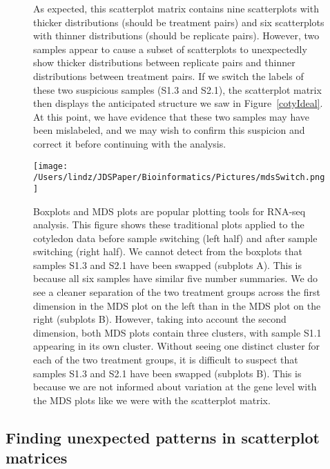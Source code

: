 \documentclass[useAMS,referee]{biom}
\begin{document}
\begin{figure}
\begin{center}
\centerline{}
\end{center}
\caption{As expected, this scatterplot matrix contains nine scatterplots with thicker distributions (should be treatment pairs) and six scatterplots with thinner distributions (should be replicate pairs). However, two samples appear to cause a subset of scatterplots to unexpectedly show thicker distributions between replicate pairs and thinner distributions between treatment pairs. If we switch the labels of these two suspicious samples (S1.3 and S2.1), the scatterplot matrix then displays the anticipated structure we saw in Figure~\ref{cotyIdeal}. At this point, we have evidence that these two samples may have been mislabeled, and we may wish to confirm this suspicion and correct it before continuing with the analysis.
\label{switchedScatMat}}
\end{figure}

\begin{figure}
\begin{center}
\centerline{\texttt{[image: /Users/lindz/JDSPaper/Bioinformatics/Pictures/mdsSwitch.png]}}
\end{center}
\caption{Boxplots and MDS plots are popular plotting tools for RNA-seq analysis. This figure shows these traditional plots applied to the cotyledon data before sample switching (left half) and after sample switching (right half). We cannot detect from the boxplots that samples S1.3 and S2.1 have been swapped (subplots A). This is because all six samples have similar five number summaries. We do see a cleaner separation of the two treatment groups across the first dimension in the MDS plot on the left than in the MDS plot on the right (subplots B). However, taking into account the second dimension, both MDS plots contain three clusters, with sample S1.1 appearing in its own cluster. Without seeing one distinct cluster for each of the two treatment groups, it is difficult to suspect that samples S1.3 and S2.1 have been swapped (subplots B). This is because we are not informed about variation at the gene level with the MDS plots like we were with the scatterplot matrix.
\label{mdsSwitch}}
\end{figure}

\subsection{Finding unexpected patterns in scatterplot matrices}
\label{s:Finding unexpected patterns in scatterplot matrices}
\end{document}
